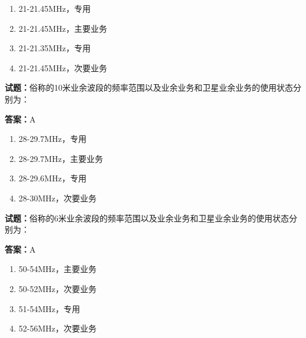\documentclass{ctexbook}
\begin{document}
\begin{enumerate}[leftmargin=3em]
  \item 21-21.45MHz，专用 

  \item 21-21.45MHz，主要业务 

  \item 21-21.35MHz，专用 

  \item 21-21.45MHz，次要业务 

\end{enumerate}





\vspace{1em}

\textbf{试题：}俗称的10米业余波段的频率范围以及业余业务和卫星业余业务的使用状态分别为： 

\textbf{答案：}A 

\begin{enumerate}[leftmargin=3em]
  \item 28-29.7MHz，专用 

  \item 28-29.7MHz，主要业务 

  \item 28-29.6MHz，专用 

  \item 28-30MHz，次要业务 

\end{enumerate}





\vspace{1em}

\textbf{试题：}俗称的6米业余波段的频率范围以及业余业务和卫星业余业务的使用状态分别为： 

\textbf{答案：}A 

\begin{enumerate}[leftmargin=3em]
  \item 50-54MHz，主要业务 

  \item 50-52MHz，次要业务 

  \item 51-54MHz，专用 

  \item 52-56MHz，次要业务 

\end{enumerate}
\end{document}
